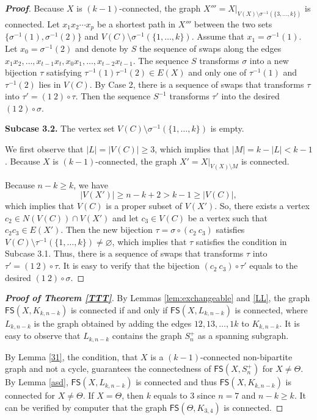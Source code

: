 \documentclass[11pt]{article}
\newcommand{\FS}{\mathsf{FS}}
\begin{document}
\begin{proof}[\bfseries{Proof}]
Because $X$ is $(k-1)$-connected, the graph  $X'''=X|_{V(X)\setminus \sigma^{-1}(\{3,\dots,k\})}$ is connected. 
Let $x_1 x_2\cdots x_p$ be a shortest path  in $X'''$ between the two sets $\{\sigma^{-1}(1),\sigma^{-1}(2)\}$ and  $V(C)\setminus \sigma^{-1}(\{1,\dots,k\})$. Assume that $x_1=\sigma^{-1}(1)$. Let $x_0=\sigma^{-1}(2)$ and denote by $S$ the sequence of swaps along the edges $x_1x_2,\dots,x_{t-1}x_t, x_0x_1,\dots,x_{t-2}x_{t-1}$. The sequence $S$ transforms $\sigma$ into a new bijection $\tau$ satisfying $\tau^{-1}(1)\tau^{-1}(2)\in E(X)$ and only one of $\tau^{-1}(1)$ and $\tau^{-1}(2)$ lies in $V(C)$. By Case 2, there is a sequence of swaps that transforms $\tau$ into $\tau'=(1 \ 2)\circ \tau$. Then the sequence $S^{-1}$ transforms $\tau'$ into the desired $(1\ 2)\circ \sigma$.

\vskip 2mm
\noindent\textbf{Subcase 3.2.} The vertex set $V(C)\setminus \sigma^{-1}(\{1,\dots,k\})$ is empty.
\vskip 2mm


We first observe that $|L|=|V(C)|\ge 3$, which implies that $|M|=k-|L|<k-1$. Because $X$ is $(k-1)$-connected, the graph $X'=X|_{V(X)\setminus M}$ is connected.

 Because $n-k\ge k$, we have 
$$|V(X')|\ge n-k+2 >   k-1  \ge |V(C)|,$$
which implies that $V(C)$ is a proper subset of $V(X')$. So, there exists a vertex $c_2\in N(V(C))\cap V(X')$ and let $c_3\in V(C)$ be a vertex such that $c_2 c_3 \in E(X')$. Then the new bijection $\tau=\sigma\circ (c_2 \ c_3)$ satisfies  $V(C)\setminus \tau^{-1}(\{1,\dots,k\})\neq \varnothing$, which implies that $\tau$ satisfies the condition in Subcase 3.1. Thus, there is a sequence of swaps that transforms $\tau$ into $\tau'=(1 \ 2)\circ \tau$. It is easy to verify that the bijection $(c_2 \ c_3)\circ \tau'$ equals to the desired $(1 \ 2)\circ \sigma$.
 \end{proof}

\begin{proof}[\bfseries{Proof of Theorem \ref{TTT}}]
By Lemmas  \ref{lem:exchangeable} and \ref{LL}, the graph $\FS(X,K_{k,n-k})$ is connected if and only if $\FS(X,L_{k,n-k})$ is connected, where $L_{k,n-k}$ is the graph obtained by adding the edges $12, 13, \dots, 1k$ to $K_{k,n-k}$. It is easy to observe that $L_{k,n-k}$ contains the graph $S^+_n$ as a spanning subgraph.

 By Lemma \ref{31}, the condition, that $X$ is a $(k-1)$-connected non-bipartite graph and  not a cycle, guarantees the connectedness of $\FS(X,S^+_n)$ for $X\neq \varTheta$. By Lemma \ref{asd}, $\FS(X,L_{k,n-k})$ is connected and thus $\FS(X,K_{k,n-k})$ is connected for $X\neq \varTheta$. If $X=\varTheta$, then $k$ equals to $3$ since $n=7$ and $n-k \ge k$. It can be verified by computer that the graph $\FS(\varTheta,K_{3,4})$ is connected. 
\end{proof}
\end{document}
